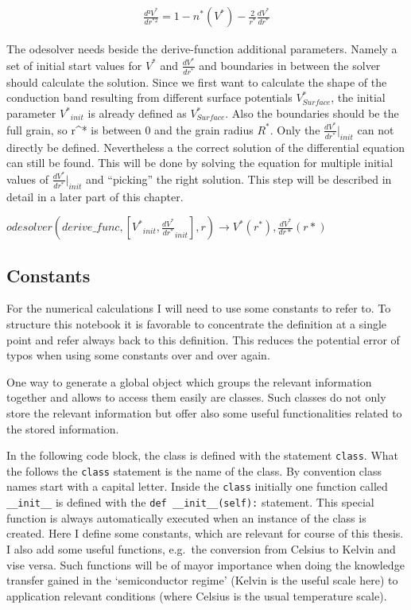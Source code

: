 \documentclass[11pt]{article}
\begin{document}
\begin{align}
\frac{d²V^{*}}{dr^{*2}}=1-n^{*}(V^{*})-\frac{2}{r^{*}}\frac{dV^{*}}{dr^{*}}\label{second_derivative}\tag{Second derivative}
\end{align}

The odesolver needs beside the derive-function additional parameters.
Namely a set of initial start values for \(V^{*}\) and
\(\frac{dV^{*}}{dr^{*}}\) and boundaries in between the solver should
calculate the solution. Since we first want to calculate the shape of
the conduction band resulting from different surface potentials
\(V^{*}_{Surface}\), the initial parameter \(V^{*}{}_{init}\) is already
defined as \(V^{*}_{Surface}\). Also the boundaries should be the full
grain, so r\^{}* is between 0 and the grain radius \(R^*\). Only the
\(\frac{dV^{*}}{dr^{*}}|_{init}\) can not directly be defined.
Nevertheless a the correct solution of the differential equation can
still be found. This will be done by solving the equation for multiple
initial values of \(\frac{dV^{*}}{dr^{*}}|_{init}\) and ``picking'' the
right solution. This step will be described in detail in a later part of
this chapter.

\(odesolver(derive\_func,[V^{*}{}_{init},\frac{dV^{*}}{dr^{*}}_{init}],r)\longrightarrow V^{*}(r^{*}),\frac{dV^{*}}{dr*}(r*)\)

    \hypertarget{constants}{%
\subsection{Constants}\label{constants}}

For the numerical calculations I will need to use some constants to
refer to. To structure this notebook it is favorable to concentrate the
definition at a single point and refer always back to this definition.
This reduces the potential error of typos when using some constants over
and over again.

One way to generate a global object which groups the relevant
information together and allows to access them easily are classes. Such
classes do not only store the relevant information but offer also some
useful functionalities related to the stored information.

In the following code block, the class is defined with the statement
\texttt{class}. What the follows the \texttt{class} statement is the
name of the class. By convention class names start with a capital
letter. Inside the \texttt{class} initially one function called
\texttt{\_\_init\_\_} is defined with the
\texttt{def\ \_\_init\_\_(self):} statement. This special function is
always automatically executed when an instance of the class is created.
Here I define some constants, which are relevant for course of this
thesis. I also add some useful functions, e.g.~the conversion from
Celsius to Kelvin and vise versa. Such functions will be of mayor
importance when doing the knowledge transfer gained in the
`semiconductor regime' (Kelvin is the useful scale here) to application
relevant conditions (where Celsius is the usual temperature scale).
\end{document}
